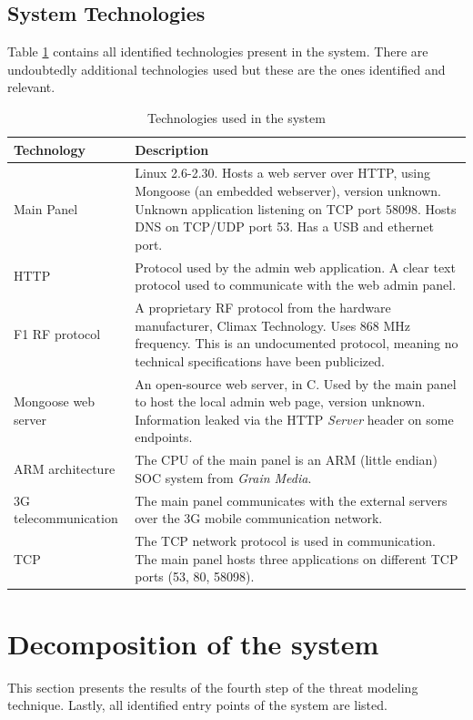 \subsection{System Technologies}
Table \ref{tb:system-technologies} contains all identified technologies present in the system. There are undoubtedly additional technologies used but these are the ones identified and relevant.
\begin{table}[!p]
    \centering
    \begin{tabularx}{\textwidth}{l X}
        \hline
        \textbf{Technology}  & \textbf{Description}
        \\ \hline
        Main Panel & Linux 2.6-2.30. Hosts a web server over HTTP, using Mongoose (an embedded webserver), version unknown. Unknown application listening on TCP port 58098. Hosts DNS on TCP/UDP port 53. Has a USB and ethernet port.
        \\ \hline
        HTTP  & Protocol used by the admin web application. A clear text protocol used to communicate with the web admin panel.
        \\ \hline
        F1 RF protocol  & A proprietary \gls{RF} protocol from the hardware manufacturer, Climax Technology. Uses 868 MHz frequency. This is an undocumented protocol, meaning no technical specifications have been publicized.
        \\ \hline
        Mongoose web server  & An open-source web server, in C. Used by the main panel to host the local admin web page, version unknown. Information leaked via the HTTP \textit{Server} header on some endpoints.
        \\ \hline
        ARM architecture  & The CPU of the main panel is an ARM (little endian) SOC system from \textit{Grain Media}.
        \\ \hline
        3G telecommunication  & The main panel communicates with the external servers over the 3G mobile communication network.
        \\ \hline
        TCP  & The \gls{TCP} network protocol is used in communication. The main panel hosts three applications on different TCP ports (53, 80, 58098).
        \\ \hline
    \end{tabularx}
    \caption{Technologies used in the system}
    \label{tb:system-technologies}
\end{table}

\section{Decomposition of the system}
This section presents the results of the fourth step of the threat modeling technique. Lastly, all identified entry points of the system are listed.

